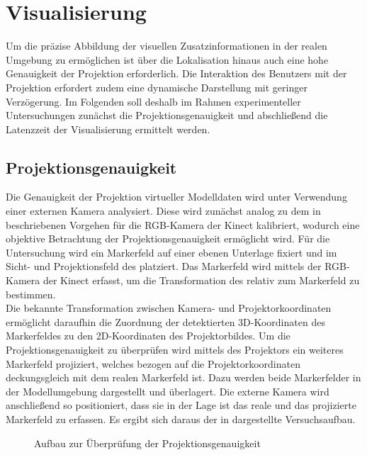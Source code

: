 \section{Visualisierung}
Um die präzise Abbildung der visuellen Zusatzinformationen in der realen Umgebung zu ermöglichen ist über die Lokalisation hinaus auch eine hohe Genauigkeit der Projektion erforderlich. Die Interaktion des Benutzers mit der Projektion erfordert zudem eine dynamische Darstellung mit geringer Verzögerung. Im Folgenden soll deshalb im Rahmen experimenteller Untersuchungen zunächst die Projektionsgenauigkeit und abschließend die Latenzzeit der Visualisierung ermittelt werden.

\subsection{Projektionsgenauigkeit}
Die Genauigkeit der Projektion virtueller Modelldaten wird unter Verwendung einer externen Kamera analysiert. Diese wird zunächst analog zu dem in  beschriebenen Vorgehen für die RGB-Kamera der Kinect kalibriert, wodurch eine objektive Betrachtung der Projektionsgenauigkeit ermöglicht wird. Für die Untersuchung wird ein Markerfeld auf einer ebenen Unterlage fixiert und im Sicht- und Projektionsfeld des  platziert. Das Markerfeld wird mittels der RGB-Kamera der Kinect erfasst, um die Transformation des  relativ zum Markerfeld zu bestimmen.\\

Die bekannte Transformation zwischen Kamera- und Projektorkoordinaten ermöglicht daraufhin die Zuordnung der detektierten 3D-Koordinaten des Markerfeldes zu den 2D-Koordinaten des Projektorbildes. Um die Projektionsgenauigkeit zu überprüfen wird mittels des Projektors ein weiteres Markerfeld projiziert, welches bezogen auf die Projektorkoordinaten deckungsgleich mit dem realen Markerfeld ist. Dazu werden beide Markerfelder in der Modellumgebung dargestellt und überlagert. Die externe Kamera wird anschließend so positioniert, dass sie in der Lage ist das reale und das projizierte Markerfeld zu erfassen. Es ergibt sich daraus der in  dargestellte Versuchsaufbau.\\

\begin{figure}[ht]
	\begin{center}%
		\caption{Aufbau zur Überprüfung der Projektionsgenauigkeit}
		\label{fig.projsetup}
	\end{center}
\end{figure}

